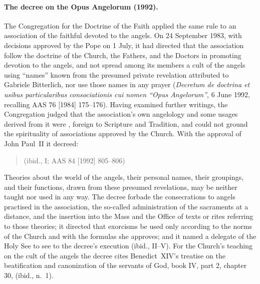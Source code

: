 \paragraph{The decree on the Opus Angelorum (1992).} The Congregation for
the Doctrine of the Faith applied the same rule to an association of the
faithful devoted to the angels. On 24 September 1983, with decisions
approved by the Pope on 1 July, it had directed that the association
follow the doctrine of the Church, the Fathers, and the Doctors in
promoting devotion to the angels, and not spread among its members a cult
of the angels using ``names'' known from the presumed private revelation
attributed to Gabriele Bitterlich, nor use those names in any prayer
(\emph{Decretum de doctrina et usibus particularibus consociationis cui
nomen ``Opus Angelorum''}, 6 June 1992, recalling AAS 76 [1984]
175--176). Having examined further writings, the Congregation judged that
the association's own angelology and some usages derived from it were
, foreign to
Scripture and Tradition, and could not ground the spirituality of
associations approved by the Church. With the approval of John Paul~II it
decreed:
\begin{quote}
 (ibid., I; AAS 84 [1992] 805--806)
\end{quote}
Theories about the world of the angels, their personal names, their
groupings, and their functions, drawn from these presumed revelations,
may be neither taught nor used in any way. The decree forbade the
consecrations to angels practised in the association, the so-called
administration of the sacraments at a distance, and the insertion into
the Mass and the Office of texts or rites referring to those theories; it
directed that exorcisms be used only according to the norms of the
Church and with the formulas she approves; and it named a delegate of the
Holy See to see to the decree's execution (ibid., II--V). For the Church's
teaching on the cult of the angels the decree cites Benedict~XIV's
treatise on the beatification and canonization of the servants of God,
book IV, part 2, chapter 30,  (ibid.,
n.~1).

